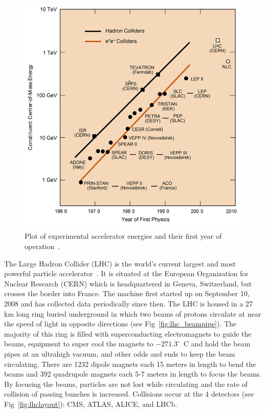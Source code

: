 		\begin{figure}[h]
\begin{center}
\includegraphics[width=0.8\linewidth]{Figs/collider_energy.jpg}
\caption{\label{fig:experiment_energies}
Plot of experimental accelerator energies and their first year of operation~\cite{comenergy}.
}
\end{center}
\end{figure} 
	
	The Large Hadron Collider (LHC) is the world's current largest and most powerful particle accelerator~\cite{cernlhc}. It is situated at the European Organization for Nuclear Research (CERN) which is headquartered in Geneva, Switzerland, but crosses the border into France. The machine first started up on September 10, 2008 and has collected data periodically since then. The LHC is housed in a 27 km long ring buried underground in which two beams of protons circulate at near the speed of light in opposite directions (see Fig~\ref{fig:lhc_beampipe}). The majority of this ring is filled with superconducting electromagnets to guide the beams, equipment to super cool the magnets to $-271.3^\circ$~C and hold the beam pipes at an ultrahigh vacuum, and other odds and ends to keep the beam circulating. There are 1232 dipole magnets each 15 meters in length to bend the beams and 392 quadrupole magnets  each 5-7 meters in length to focus the beams. By focusing the beams, particles are not lost while circulating and the rate of collision of passing bunches is increased. Collisions occur at the 4 detectors (see Fig~\ref{fig:lhclayout}): CMS, ATLAS, ALICE, and LHCb.
	
